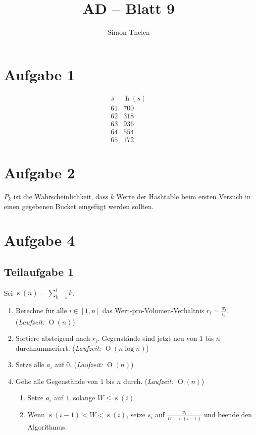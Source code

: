 \documentclass[a4paper]{article}
\title{AD -- Blatt 9}
\author{Simon Thelen}
\begin{document}
    \maketitle

    \section*{Aufgabe 1}
    \begin{equation*}
        \begin{array}{ll}
            s & \operatorname{h}(s) \\
            \hline
            61 & 700 \\
            62 & 318 \\
            63 & 936 \\
            64 & 554 \\
            65 & 172
        \end{array}
    \end{equation*}

    \section*{Aufgabe 2}
    $P_k$ ist die Wahrscheinlichkeit, dass $k$ Werte der Hashtable beim ersten Versuch in einen gegebenen Bucket eingefügt werden sollten.

    \section*{Aufgabe 4}
    \subsection*{Teilaufgabe 1}
    \label{subsec:aufgabe4_1}

    Sei $\operatorname{s}(n) = \sum_{k = 1}^{i}{k}$.

    \begin{enumerate}
        \item Berechne für alle $i \in [1, n]$ das Wert-pro-Volumen-Verhältnis $r_i = \frac{w_i}{v_i}$.
        (\textit{Laufzeit: $\operatorname{O}(n)$})

        \item Sortiere absteigend nach $r_i$.
        Gegenstände sind jetzt neu von $1$ bis $n$ durchnummeriert.
        (\textit{Laufzeit: $\operatorname{O}(n \log{n})$})

        \item Setze alle $a_i$ auf $0$.
        (\textit{Laufzeit: $\operatorname{O}(n)$})

        \item Gehe alle Gegenstände von $1$ bis $n$ durch.
        (\textit{Laufzeit: $\operatorname{O}(n)$})
        \begin{enumerate}
            \item Setze $a_i$ auf $1$, solange $W \leq \operatorname{s}(i)$
            \item Wenn $\operatorname{s}(i - 1) < W < \operatorname{s}(i)$, setze $s_i$ auf $\frac{v_i}{W - \operatorname{s}(i - 1)}$ und beende den Algorithmus.
        \end{enumerate}
    \end{enumerate}
\end{document}
